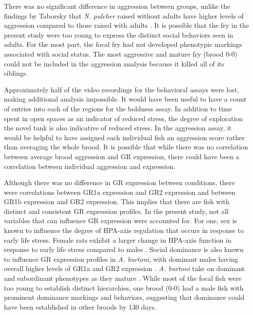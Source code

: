 \documentclass[12pt,twoside]{reedthesis}
\begin{document}
There was no significant difference in aggression between groups, unlike the
findings by Taborsky that \textit{N. pulcher} raised without adults have higher levels of
aggression compared to those raised with adults \citep{arnold_social_2010}. It
is possible that the fry in the present study were too young to express the
distinct social behaviors seen in adults. For the most part, the focal fry had not developed
phenotypic markings associated with social status. The most aggressive and
mature fry (brood 0-0) could not be included in
the aggression analysis because it killed all of its siblings.

Approximately half of the video recordings for the behavioral assays
were lost, making additional analysis impossible. It would have been useful to
have a count of entries into each of the regions for the boldness assay. In
addition to time spent in open spaces as an indicator of reduced
stress, the degree of exploration the novel tank is also indicative of
reduced stress. In the aggression assay, it would be helpful to have assigned
each individual fish an aggression score rather than averaging the whole brood.
It is possible that while there was no correlation between average brood
aggression and GR expression, there could have been a correlation between
individual aggression and expression. 

Although there was no difference in GR expression between conditions, there were
correlations between GR1a expression and GR2 expression and between GR1b
expression and GR2 expression. This implies that there are fish with distinct
and consistent GR expression profiles. In the present study, not all variables that can influence GR expression were
accounted for. For one, sex is known to influence the degree of HPA-axis
regulation that occurs in response to early life stress. Female rats exhibit a
larger change in HPA-axis function in response to early life stress compared to males \citep{mccormick_sex-specific_1995}. Social dominance is also known to influence
GR expression profiles in \textit{A. burtoni}, with dominant
males having overall higher levels of GR1a and GR2 expression \citep{korzan_social_2014}. \textit{A.
  burtoni} take on dominant and subordinant phenotypes as they mature \citep{fernald_quantitative_1977}. While
most of the focal fish were too young to establish distinct hierarchies, one
brood (0-0) had a male fish with prominent dominance markings and behaviors,
suggesting that dominance could have been established in other broods by 130 days. 
\end{document}
